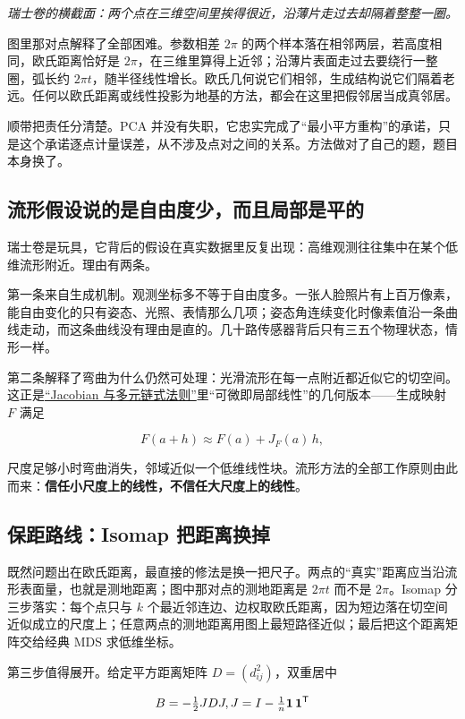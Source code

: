 \emph{瑞士卷的横截面：两个点在三维空间里挨得很近，沿薄片走过去却隔着整整一圈。}

图里那对点解释了全部困难。参数相差 \(2\pi\) 的两个样本落在相邻两层，若高度相同，欧氏距离恰好是 \(2\pi\)，在三维里算得上近邻；沿薄片表面走过去要绕行一整圈，弧长约 \(2\pi t\)，随半径线性增长。欧氏几何说它们相邻，生成结构说它们隔着老远。任何以欧氏距离或线性投影为地基的方法，都会在这里把假邻居当成真邻居。

顺带把责任分清楚。PCA 并没有失职，它忠实完成了``最小平方重构''的承诺，只是这个承诺逐点计量误差，从不涉及点对之间的关系。方法做对了自己的题，题目本身换了。

\subsection{流形假设说的是自由度少，而且局部是平的}

瑞士卷是玩具，它背后的假设在真实数据里反复出现：高维观测往往集中在某个低维流形附近。理由有两条。

第一条来自生成机制。观测坐标多不等于自由度多。一张人脸照片有上百万像素，能自由变化的只有姿态、光照、表情那么几项；姿态角连续变化时像素值沿一条曲线走动，而这条曲线没有理由是直的。几十路传感器背后只有三五个物理状态，情形一样。

第二条解释了弯曲为什么仍然可处理：光滑流形在每一点附近都近似它的切空间。这正是\hyperref[sec:02-Calculus/06-Multivariable-Calculus/04]{``Jacobian 与多元链式法则''}里``可微即局部线性''的几何版本——生成映射 \(F\) 满足

\[
F(a+h)\approx F(a)+J_F(a)\,h ,
\]

尺度足够小时弯曲消失，邻域近似一个低维线性块。流形方法的全部工作原则由此而来：\textbf{信任小尺度上的线性，不信任大尺度上的线性}。

\subsection{保距路线：Isomap 把距离换掉}

既然问题出在欧氏距离，最直接的修法是换一把尺子。两点的``真实''距离应当沿流形表面量，也就是测地距离；图中那对点的测地距离是 \(2\pi t\) 而不是 \(2\pi\)。Isomap 分三步落实：每个点只与 \(k\) 个最近邻连边、边权取欧氏距离，因为短边落在切空间近似成立的尺度上；任意两点的测地距离用图上最短路径近似；最后把这个距离矩阵交给经典 MDS 求低维坐标。

第三步值得展开。给定平方距离矩阵 \(D=(d_{ij}^2)\)，双重居中

\[
B=-\tfrac12 JDJ,
\space
J = I-\tfrac1n\mathbf{1}\,\mathbf{1}^{\mathsf{T}}
\]

